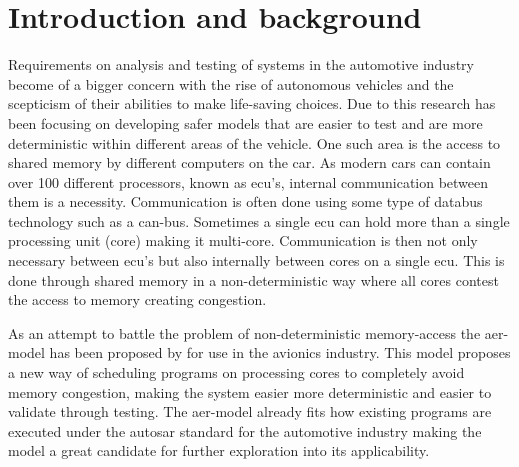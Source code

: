 \documentclass{kththesis}
\begin{document}
\printglossary[title={Acronyms}]

\tableofcontents

\mainmatter


\chapter{Introduction and background} 





Requirements on analysis and testing of systems in the automotive industry become of a bigger
concern with the rise of autonomous vehicles and the scepticism of their abilities to make
life-saving choices. Due to this research has been focusing on developing safer models that are
easier to test and are more deterministic within different areas of the vehicle. One such area is
the access to shared memory by different computers on the car. As modern cars can contain over 100
different processors, known as \acrshort{ecu}'s, internal communication between them is a
necessity. Communication is often done using some type of databus technology such as a
\acrshort{can}-bus. Sometimes a single \acrshort{ecu} can hold more than a single processing unit
(core) making it multi-core. Communication is then not only necessary between \acrshort{ecu}'s but
also internally between cores on a single \acrshort{ecu}. This is done through shared memory in a
non-deterministic way where all cores contest the access to memory creating congestion.


As an attempt to battle the problem of non-deterministic memory-access the \acrshort{aer}-model has
been proposed by \textcite{durrieu_predictable_2014} for use in the avionics industry. This model
proposes a new way of scheduling programs on processing cores to completely avoid memory
congestion, making the system easier more deterministic and easier to validate through testing. The
\acrshort{aer}-model already fits how existing programs are executed under the \acrshort{autosar}
standard for the automotive industry making the model a great candidate for further exploration into
its applicability.

\end{document}
